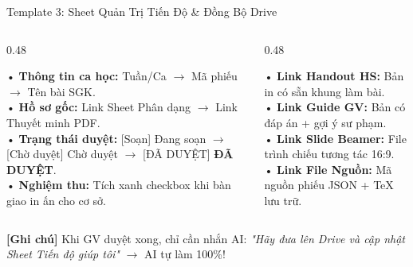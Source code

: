 \documentclass[aspectratio=169,11pt]{beamer}
\begin{document}
\begin{frame}{Template 3: Sheet Quản Trị Tiến Độ \& Đồng Bộ Drive}
  \begin{columns}[T]
    \begin{column}{0.48\textwidth}
      \begin{tcolorbox}[slidecard, title=Cấu Trúc Quản Trị Tiến Độ Tuần]
        \scriptsize
        • \textbf{Thông tin ca học:} Tuần/Ca $\to$ Mã phiếu $\to$ Tên bài SGK.\\[3pt]
        • \textbf{Hồ sơ gốc:} Link Sheet Phân dạng $\to$ Link Thuyết minh PDF.\\[3pt]
        • \textbf{Trạng thái duyệt:} [Soạn] Đang soạn $\to$ [Chờ duyệt] Chờ duyệt $\to$ [ĐÃ DUYỆT] \textbf{ĐÃ DUYỆT}.\\[3pt]
        • \textbf{Nghiệm thu:} Tích xanh checkbox khi bàn giao in ấn cho cơ sở.
      \end{tcolorbox}
    \end{column}

    \begin{column}{0.48\textwidth}
      \begin{tcolorbox}[successcard, title=Đồng Bộ 100\% Lên Google Drive]
        \scriptsize
        • \textbf{Link Handout HS:} Bản in có sẵn khung làm bài.\\[3pt]
        • \textbf{Link Guide GV:} Bản có đáp án + gợi ý sư phạm.\\[3pt]
        • \textbf{Link Slide Beamer:} File trình chiếu tương tác 16:9.\\[3pt]
        • \textbf{Link File Nguồn:} Mã nguồn phiếu JSON + TeX lưu trữ.
      \end{tcolorbox}
    \end{column}
  \end{columns}
  \vspace{2pt}
  \begin{tcolorbox}[accentcard]
    \centering\scriptsize
    \textbf{[Ghi chú]} Khi GV duyệt xong, chỉ cần nhắn AI: \textit{"Hãy đưa lên Drive và cập nhật Sheet Tiến độ giúp tôi"} $\to$ AI tự làm 100\%!
  \end{tcolorbox}
\end{frame}
\end{document}
